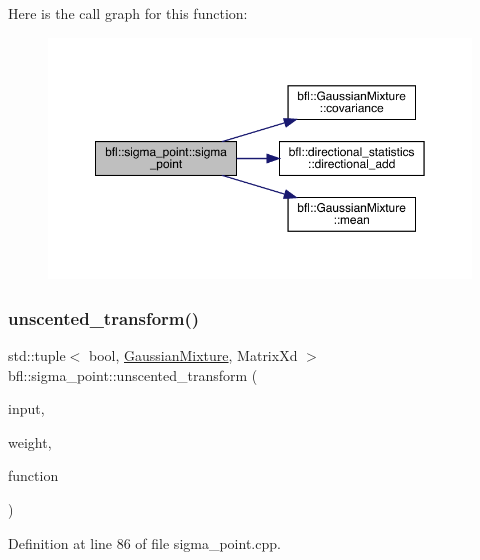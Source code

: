 Here is the call graph for this function\+:
\nopagebreak
\begin{figure}[H]
\begin{center}
\leavevmode
\includegraphics[width=350pt]{namespacebfl_1_1sigma__point_ab919aca5fccc30ee2acd5cd966cd9dc9_cgraph}
\end{center}
\end{figure}
\mbox{\label{namespacebfl_1_1sigma__point_afe170453152d4f96db4dad71bd9be9a3}} 
\subsubsection{\texorpdfstring{unscented\+\_\+transform()}{unscented\_transform()}\hspace{0.1cm}{\footnotesize\ttfamily [1/8]}}
{\footnotesize\ttfamily std\+::tuple$<$ bool, \mbox{\hyperlink{classbfl_1_1GaussianMixture}{Gaussian\+Mixture}}, Matrix\+Xd $>$ bfl\+::sigma\+\_\+point\+::unscented\+\_\+transform (\begin{DoxyParamCaption}\item[{const \mbox{\hyperlink{classbfl_1_1GaussianMixture}{Gaussian\+Mixture}} \&}]{input,  }\item[{const \mbox{\hyperlink{structbfl_1_1sigma__point_1_1UTWeight}{U\+T\+Weight}} \&}]{weight,  }\item[{\mbox{\hyperlink{namespacebfl_1_1sigma__point_a6b412638c2556e4c1f84ba10965f785e}{Function\+Evaluation}}}]{function }\end{DoxyParamCaption})}



Definition at line 86 of file sigma\+\_\+point.\+cpp.



